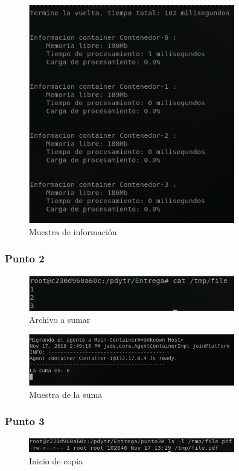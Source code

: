 \documentclass[12pt,journal,compsoc]{IEEEtran}
\begin{document}
\begin{figure}[H]
  \centering
  \label{fig:punto-1-muestra}
  \includegraphics[width=90mm]{images/punto-1/2-muestra.png}
  \caption{Muestra de información}
\end{figure}

\subsubsection{Punto 2}
\label{section:cap-punto2}

\begin{figure}[H]
  \centering
  \label{fig:punto-2-archivo}
  \includegraphics[width=90mm]{images/punto-2/1-archivo.png}
  \caption{Archivo a sumar}
\end{figure}

\begin{figure}[H]
  \centering
  \label{fig:punto-2-ejecucion}
  \includegraphics[width=90mm]{images/punto-2/2-ejecucion.png}
  \caption{Muestra de la suma}
\end{figure}


\subsubsection{Punto 3}
\label{section:cap-punto3}
\begin{figure}[H]
  \centering
  \label{fig:initial-file}
  \includegraphics[width=90mm]{images/punto-3/1-initial-file.png}
  \caption{Inicio de copia}
\end{figure}
\end{document}
